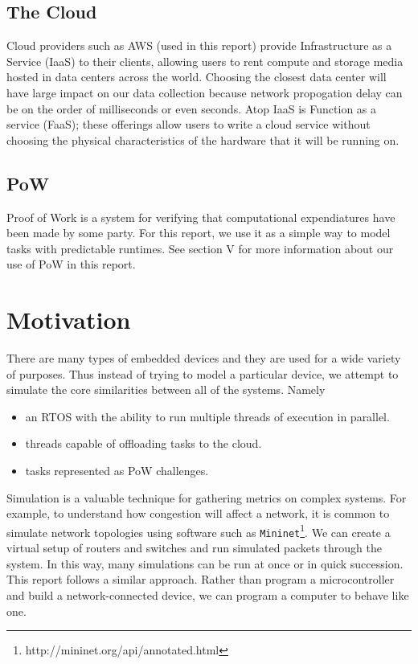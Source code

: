 \documentclass[twoside,twocolumn]{article}
\newcommand{\newp}{\newline\indent}
\begin{document}
\subsection{The Cloud}

Cloud providers such as AWS (used in this report) provide Infrastructure as a Service (IaaS) to their clients, allowing users to rent compute and storage media hosted in data centers across the world.
Choosing the closest data center will have large impact on our data collection because network propogation delay can be on the order of milliseconds or even seconds.
\newp Atop IaaS is Function as a service (FaaS); these offerings allow users to write a cloud service without choosing the physical characteristics of the hardware that it will be running on.

\subsection{PoW}

Proof of Work is a system for verifying that computational expendiatures have been made by some party.
For this report, we use it as a simple way to model tasks with predictable runtimes.
\newp See section V for more information about our use of PoW in this report.


\section{Motivation}

There are many types of embedded devices and they are used for a wide variety of purposes.
Thus instead of trying to model a particular device, we attempt to simulate the core similarities between all of the systems.
Namely
\begin{itemize}
  \item an RTOS with the ability to run multiple threads of execution in parallel.
  \item threads capable of offloading tasks to the cloud.
  \item tasks represented as PoW challenges.
\end{itemize}

Simulation is a valuable technique for gathering metrics on complex systems.
For example, to understand how congestion will affect a network, it is common to simulate network topologies using software such as \texttt{Mininet}\footnote{http://mininet.org/api/annotated.html}.
We can create a virtual setup of routers and switches and run simulated packets through the system.
In this way, many simulations can be run at once or in quick succession.
\newp This report follows a similar approach.
Rather than program a microcontroller and build a network-connected device, we can program a computer to behave like one.
\end{document}
